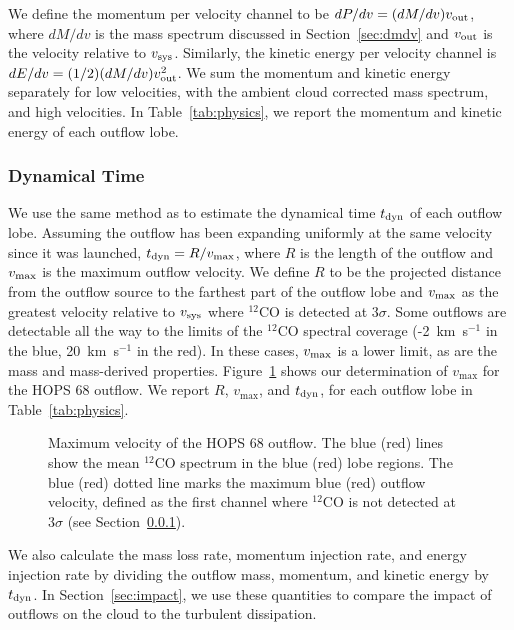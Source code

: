 \documentclass[twocolumn]{aastex63}
\newcommand{\example}{HOPS 68}
\newcommand{\kms}{km~s$^{-1}$}
\newcommand{\co}[1][]{\ensuremath{^{#1}}CO}
\begin{document}
We define the momentum per velocity channel to be $dP/dv = (dM/dv) v_{\rm out}$, where $dM/dv$ is the mass spectrum discussed in Section~\ref{sec:dmdv} and $v_{\rm out}$ is the velocity relative to $v_{\rm sys}$. Similarly, the kinetic energy per velocity channel is $dE/dv = (1/2) (dM/dv)  v_{\rm out}^2$. We sum the momentum and kinetic energy separately for low velocities, with the ambient cloud corrected mass spectrum, and high velocities. In Table~\ref{tab:physics}, we report the momentum and kinetic energy of each outflow lobe.

\subsubsection{Dynamical Time}\label{sec:tdyn}
We use the same method as \citet{Curtis10} to estimate the dynamical time $t_{\rm dyn}$ of each outflow lobe. Assuming the outflow has been expanding uniformly at the same velocity since it was launched, $t_{\rm dyn} = R / v_{\rm max}$, where $R$ is the length of the outflow and $v_{\rm max}$ is the maximum outflow velocity. We define $R$ to be the projected distance from the outflow source to the farthest part of the outflow lobe and $v_{\rm max}$ as the greatest velocity relative to $v_{\rm sys}$ where \co[12]{} is detected at $3\sigma$. Some outflows are detectable all the way to the limits of the \co[12]{} spectral coverage (-2~\kms{} in the blue, 20~\kms{} in the red). In these cases, $v_{\rm max}$ is a lower limit, as are the mass and mass-derived properties. Figure~\ref{fig:vmax} shows our determination of $v_{\max}$ for the \example{} outflow. We report $R$, $v_{\max}$, and $t_{\rm dyn}$, for each outflow lobe in Table~\ref{tab:physics}.

\begin{figure}
\caption{Maximum velocity of the \example{} outflow. The blue (red) lines show the mean \co[12]{} spectrum in the blue (red) lobe regions. The blue (red) dotted line marks the maximum blue (red) outflow velocity, defined as the first channel where \co[12]{} is not detected at $3\sigma$ (see Section~\ref{sec:tdyn}).\label{fig:vmax}}
\end{figure}

We also calculate the mass loss rate, momentum injection rate, and energy injection rate by dividing the outflow mass, momentum, and kinetic energy by $t_{\rm dyn}$. In Section~\ref{sec:impact}, we use these quantities to compare the impact of outflows on the cloud to the turbulent dissipation.
\end{document}
